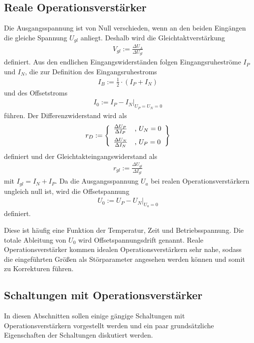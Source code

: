 \documentclass[]{scrartcl}
\begin{document}
\subsection{Reale Operationsverstärker}
Die Ausgangsspannung ist von Null verschieden, wenn an den beiden Eingängen die gleiche Spannung $U_{gl}$ anliegt. Deshalb wird die Gleichtaktverstärkung
\begin{align}
 V_{gl}:=\frac{\Delta U_{A}}{\Delta U_{gl}}
\end{align}
definiert. 
Aus den endlichen Eingangswiderständen folgen Eingangsruheströme $I_{P}$ und $I_{N}$, die zur Definition des Eingangsruhestroms
\begin{align}
 I_{B}:=\frac{1}{2} \cdot \left(I_{P}+I_{N}\right)
\end{align}
und des Offsetstroms
\begin{align}
 I_{0}:= \left. I_{P}-I_{N}\right|_{U_{P}=U_{N}=0} 
\end{align}
führen.
Der Differenzwiderstand wird als
\begin{align}
 r_{D}:=\left\lbrace 
\begin{array}{ll}
\frac{\Delta U_{P}}{\Delta I_{P}} & \text{, }U_{N}=0 \vspace{0.2cm}\\
\frac{\Delta U_{N}}{\Delta I_{N}} & \text{, }U_{P}=0
\end{array}
\right\rbrace 
\end{align}
definiert und der Gleichtakteingangswiderstand als
\begin{align}
 r_{gl}:=\frac{\Delta U_{gl}}{\Delta I_{gl}}
\end{align}
mit $I_{gl}=I_N+I_P$.
Da die Ausgangsspannung $U_{a}$ bei realen Operationsverstärkern ungleich null ist, wird die Offsetspannung
\begin{align}
 U_0:=\left. U_{P}-U_{N} \right|_{U_{a}=0}
\end{align}
definiert.

Diese ist häufig eine Funktion der Temperatur, Zeit und Betriebsspannung. Die totale Ableitung von $U_{0}$ wird Offsetspannungsdrift genannt.
Reale Operationsverstärker kommen idealen Operationsverstärkern sehr nahe, sodass die eingeführten Größen als Störparameter angesehen werden können und somit zu Korrekturen führen.

\subsection{Schaltungen mit Operationsverstärker}
In diesen Abschnitten sollen einige gängige Schaltungen mit Operationsverstärkern vorgestellt werden und ein paar grundsätzliche Eigenschaften der Schaltungen diskutiert werden.
\end{document}
